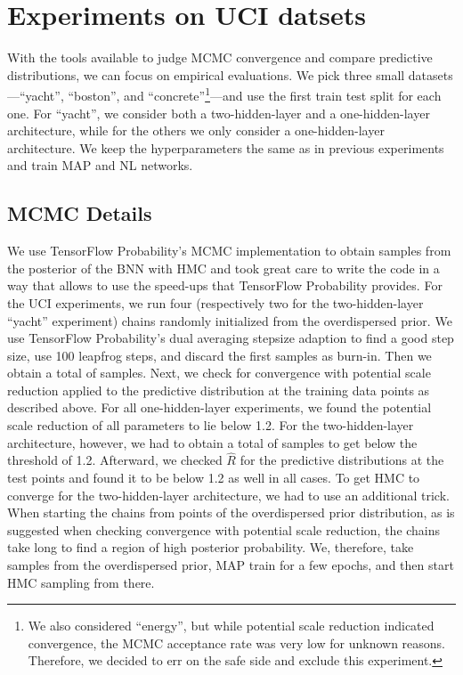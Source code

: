 \documentclass[../thesis.tex]{subfiles}
\begin{document}
\section{Experiments on UCI datsets}
With the tools available to judge MCMC convergence and compare predictive distributions, we can focus on empirical evaluations. We pick three small datasets---``yacht'', ``boston'', and ``concrete''\footnote{We also considered ``energy'', but while potential scale reduction indicated convergence, the MCMC acceptance rate was very low for unknown reasons. Therefore, we decided to err on the safe side and exclude this experiment.}---and use the first train test split for each one. For ``yacht'', we consider both a two-hidden-layer and a one-hidden-layer architecture, while for the others we only consider a one-hidden-layer architecture. We keep the hyperparameters the same as in previous experiments and train  MAP and NL networks.

\subsection*{MCMC Details}
We use TensorFlow Probability's MCMC implementation \parencite{lao2020tfp} to obtain samples from the posterior of the BNN with HMC and took great care to write the code in a way that allows to use the speed-ups that TensorFlow Probability provides.
For the UCI experiments, we run four (respectively two for the two-hidden-layer ``yacht'' experiment) chains randomly initialized from the overdispersed prior. We use TensorFlow Probability's dual averaging stepsize adaption \parencite{hoffman2014no} to find a good step size, use 100 leapfrog steps, and discard the first  samples as burn-in. Then we obtain a total of  samples. Next, we check for convergence with potential scale reduction applied to the predictive distribution at the training data points as described above. For all one-hidden-layer experiments, we found the potential scale reduction of all parameters to lie below 1.2. For the two-hidden-layer architecture, however, we had to obtain a total of  samples to get below the threshold of 1.2. Afterward, we checked $\hat{R}$ for the predictive distributions at the test points and found it to be below 1.2 as well in all cases. To get HMC to converge for the two-hidden-layer architecture, we had to use an additional trick. When starting the chains from points of the overdispersed prior distribution, as is suggested when checking convergence with potential scale reduction, the chains take long to find a region of high posterior probability. We, therefore, take samples from the overdispersed prior, MAP train for a few epochs, and then start HMC sampling from there.
\end{document}
